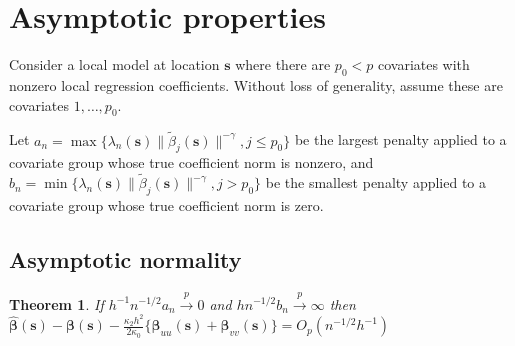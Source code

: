\documentclass[authoryear, review, 11pt]{elsarticle}
\newtheorem{theorem}{Theorem}[section]
\begin{document}
    \section{Asymptotic properties}
        Consider a local model at location $\bm{s}$ where there are $p_0 < p$ covariates with nonzero local regression coefficients. Without loss of generality, assume these are covariates $1, \dots, p_0$.
        
        Let $a_n = \max \{ \lambda_n(\bm{s}) \| \tilde{\beta}_j(\bm{s}) \|^{-\gamma}, j \le p_0 \}$ be the largest penalty applied to a covariate group whose true coefficient norm is nonzero, and $b_n = \min \{ \lambda_n(\bm{s}) \| \tilde{\beta}_j(\bm{s}) \|^{-\gamma}, j > p_0 \}$ be the smallest penalty applied to a covariate group whose true coefficient norm is zero.


    \subsection{Asymptotic normality}
    
        \begin{theorem}\label{theorem:consistency} \label{theorem:normality}
            If $h^{-1} n^{-1/2} a_n \xrightarrow{p} 0$ and $h n^{-1/2} b_n \xrightarrow{p} \infty$ then $\hat{\bm{\beta}}(\bm{s}) - \bm{\beta}(\bm{s}) - \frac{\kappa_2 h^2}{2 \kappa_0} \{ \bm{\beta}_{uu}(\bm{s}) + \bm{\beta}_{vv}(\bm{s}) \} = O_p(n^{-1/2} h^{-1} )$
        \end{theorem}
  
\end{document}
